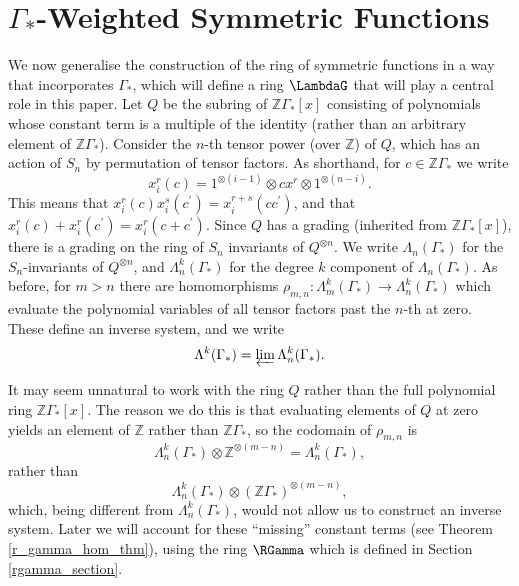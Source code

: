 \section{\texorpdfstring{$\Gamma_*$}{Gamma}-Weighted Symmetric Functions} \label{LambdaG_section}

We now generalise the construction of the ring of symmetric functions in a way that incorporates $\Gamma_*$, which will define a ring $\LambdaG$ that will play a central role in this paper. Let $Q$ be the subring of $\mathbb{Z}\Gamma_*[x]$ consisting of polynomials whose constant term is a multiple of the identity (rather than an arbitrary element of $\mathbb{Z}\Gamma_*$). Consider the $n$-th tensor power (over $\mathbb{Z}$) of $Q$, which has an action of $S_n$ by permutation of tensor factors. As shorthand, for $c \in \mathbb{Z}\Gamma_*$ we write 
\[
x_i^r(c) = 1^{\otimes (i-1)} \otimes cx^r \otimes 1^{\otimes (n-i)}.
\]
This means that $x_i^r(c) x_i^s(c^\prime) = x_i^{r+s}(cc^\prime)$, and that $x_i^r(c) + x_i^r(c^\prime) = x_i^r(c+c^\prime)$. Since $Q$ has a grading (inherited from $\mathbb{Z}\Gamma_*[x]$), there is a grading on the ring of $S_n$ invariants of $Q^{\otimes n}$. We write $\Lambda_n(\Gamma_*)$ for the $S_n$-invariants of $Q^{\otimes n}$, and $\Lambda_n^k(\Gamma_*)$ for the degree $k$ component of $\Lambda_n(\Gamma_*)$. As before, for $m>n$ there are homomorphisms $\rho_{m,n}: \Lambda_{m}^k(\Gamma_*) \to \Lambda_{n}^k(\Gamma_*)$ which evaluate the polynomial variables of all tensor factors past the $n$-th at zero. These define an inverse system, and we write
\[
\Lambda^k(\Gamma_*) = \varprojlim \Lambda_n^k(\Gamma_*).
\]
\begin{remark}
It may seem unnatural to work with the ring $Q$ rather than the full polynomial ring $\mathbb{Z}\Gamma_*[x]$. The reason we do this is that evaluating elements of $Q$ at zero yields an element of $\mathbb{Z}$ rather than $\mathbb{Z}\Gamma_*$, so the codomain of $\rho_{m,n}$ is
\[
\Lambda_n^k(\Gamma_*) \otimes \mathbb{Z}^{\otimes (m-n)} = \Lambda_n^k(\Gamma_*),
\]
rather than
\[
\Lambda_n^k(\Gamma_*) \otimes (\mathbb{Z}\Gamma_*)^{\otimes (m-n)},
\]
which, being different from $\Lambda_n^k(\Gamma_*)$, would not allow us to construct an inverse system. Later we will account for these ``missing'' constant terms (see Theorem \ref{r_gamma_hom_thm}), using the ring $\RGamma$ which is defined in Section \ref{rgamma_section}.
\end{remark}

